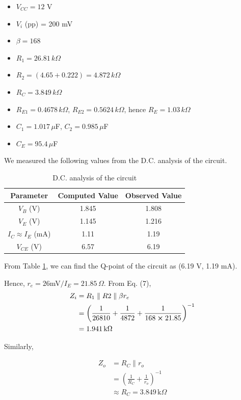 \begin{itemize}
    \item $V_{CC} = 12$ V
    \item $V_i$ (pp) = 200 mV
    \item $\beta = 168$
    \item $R_1=26.81\,k\Omega$
    \item $R_2=(4.65+0.222)=4.872\,k\Omega$
    \item $R_C=3.849\,k\Omega$
    \item $R_{E1}=0.4678\,k\Omega$, $R_{E2}=0.5624\,k\Omega$, hence $R_E=1.03\,k\Omega$
    \item $C_1=1.017\,\mu$F, $C_2=0.985\,\mu$F
    \item $C_E=95.4\,\mu$F\\
\end{itemize}

We measured the following values from the D.C. analysis of the circuit.

\begin{table}[H]
    \centering
    \begin{tabular}{|c|c|c|}
    \hline
    Parameter & Computed Value & Observed Value \\ \hline
    $V_B$ (V) & 1.845  &  1.808 \\
    $V_E$ (V) & 1.145  &  1.216 \\
    $I_C\approx I_E$ (mA) & 1.11 & 1.19 \\
    $V_{CE}$ (V) & 6.57 & 6.19 \\
    \hline
    \end{tabular}
    \caption{D.C. analysis of the circuit}
    \label{tab:1}
\end{table}

From Table \ref{tab:1}, we can find the Q-point of the circuit as (6.19 V, 1.19 mA).

Hence, $r_e=26$mV$/I_E=21.85\,\Omega$.
From Eq. (7),
\begin{align*}
    Z_i &= R_1 \parallel R2 \parallel \beta r_e \\
    &= \left( \frac{1}{26810}+\frac{1}{4872}+\frac{1}{168\cross 21.85} \right)^{-1} \\
    &= 1.941\,\text{k}\Omega
\end{align*}

Similarly,

\begin{align*}
    Z_o &= R_C \parallel r_o \\
    &= \left( \frac{1}{R_C}+\frac{1}{r_o}\right)^{-1} \\
    &\approx R_C=3.849\,\text{k}\Omega
\end{align*}

